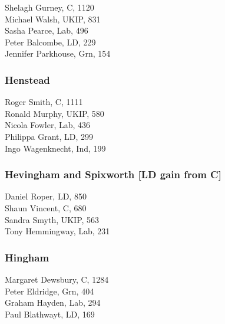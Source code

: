\documentclass[a4paper,openany,10pt]{book}
\begin{document}


Shelagh Gurney, C, 1120\\
Michael Walsh, UKIP, 831\\
Sasha Pearce, Lab, 496\\
Peter Balcombe, LD, 229\\
Jennifer Parkhouse, Grn, 154\\


\subsubsection*{Henstead}



Roger Smith, C, 1111\\
Ronald Murphy, UKIP, 580\\
Nicola Fowler, Lab, 436\\
Philippa Grant, LD, 299\\
Ingo Wagenknecht, Ind, 199\\


\subsubsection*{Hevingham and Spixworth \hspace*{\fill}\nolinebreak[1]%
\enspace\hspace*{\fill}
[LD gain from C]}



Daniel Roper, LD, 850\\
Shaun Vincent, C, 680\\
Sandra Smyth, UKIP, 563\\
Tony Hemmingway, Lab, 231\\


\subsubsection*{Hingham}



Margaret Dewsbury, C, 1284\\
Peter Eldridge, Grn, 404\\
Graham Hayden, Lab, 294\\
Paul Blathwayt, LD, 169\\
\end{document}
